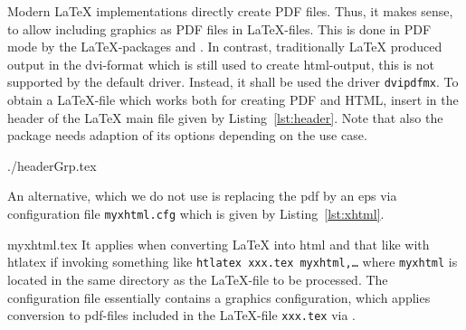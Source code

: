 Modern \LaTeX{} implementations directly create PDF files. 
Thus, it makes sense, 
to allow including graphics as PDF files in \LaTeX-files. 
This is done in PDF mode 
by the \LaTeX-packages  and . 
In contrast, traditionally \LaTeX{} produced output in the \gls{dvi}-format 
which is still used to create \gls{html}-output, 
this is not supported by the default driver. 
Instead, it shall be used the driver \texttt{dvipdfmx}. 
To obtain a \LaTeX-file which works both for creating PDF and HTML, 
insert in the header of the \LaTeX{} main file
given by Listing~\ref{lst:header}. 
Note that also the package  needs adaption of its options 
depending on the use case. 
%

%
%
{./headerGrp.tex}%


An alternative, which we do not use 
is replacing the \gls{pdf} by an \gls{eps} via configuration file \texttt{myxhtml.cfg} 
which is given by Listing~\ref{lst:xhtml}. 
%

{myxhtml.tex}
%
It applies when converting \LaTeX{} into html and that like 
with htlatex if invoking something like \texttt{htlatex xxx.tex myxhtml,\ldots} 
where \texttt{myxhtml} is located in the same directory as the \LaTeX-file 
to be processed. 
The configuration file essentially contains a graphics configuration, 
which applies conversion to pdf-files included in the \LaTeX-file \texttt{xxx.tex}
via . 


